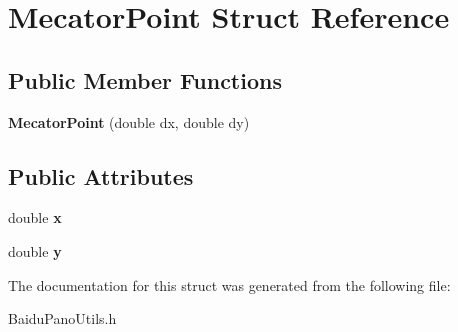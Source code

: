 \hypertarget{struct_mecator_point}{}\section{Mecator\+Point Struct Reference}
\label{struct_mecator_point}
\subsection*{Public Member Functions}
\begin{DoxyCompactItemize}
\item 
\hypertarget{struct_mecator_point_a2a46e3fabd7ef447cb439b3be1292573}{}{\bfseries Mecator\+Point} (double dx, double dy)\label{struct_mecator_point_a2a46e3fabd7ef447cb439b3be1292573}

\end{DoxyCompactItemize}
\subsection*{Public Attributes}
\begin{DoxyCompactItemize}
\item 
\hypertarget{struct_mecator_point_a423ba8baedd3afab4f84621d001e59a8}{}double {\bfseries x}\label{struct_mecator_point_a423ba8baedd3afab4f84621d001e59a8}

\item 
\hypertarget{struct_mecator_point_a8d18558f7f9c4e8edf30d18761217574}{}double {\bfseries y}\label{struct_mecator_point_a8d18558f7f9c4e8edf30d18761217574}

\end{DoxyCompactItemize}


The documentation for this struct was generated from the following file\+:\begin{DoxyCompactItemize}
\item 
Baidu\+Pano\+Utils.\+h\end{DoxyCompactItemize}
